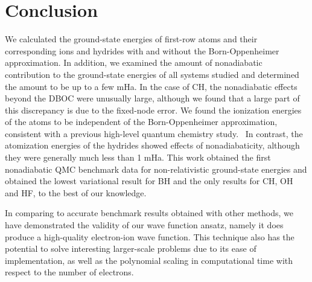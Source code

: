 \section{Conclusion}
We calculated the ground-state energies of first-row atoms and their corresponding ions and hydrides with and without the Born-Oppenheimer approximation. In addition, we examined the amount of nonadiabatic contribution to the ground-state energies of all systems studied and determined the amount to be up to a few mHa. In the case of CH, the nonadiabatic effects beyond the DBOC were unusually large, although we found that a large part of this discrepancy is due to the fixed-node error.
We found the ionization energies of the atoms to be independent of the Born-Oppenheimer approximation, consistent with a previous high-level quantum chemistry study.~\cite{Klopper_IP} In contrast, the atomization energies of the hydrides showed effects of nonadiabaticity, although they were generally much less than 1 mHa. This work obtained the first nonadiabatic QMC benchmark data for non-relativistic ground-state energies and obtained the lowest variational result for BH and the only results for CH, OH and HF, to the best of our knowledge.

In comparing to accurate benchmark results obtained with other methods, we have demonstrated the validity of our wave function ansatz, namely it does produce a high-quality electron-ion wave function. This technique also has the potential to solve interesting larger-scale problems due to its ease of implementation, as well as the polynomial scaling in computational time with respect to the number of electrons.